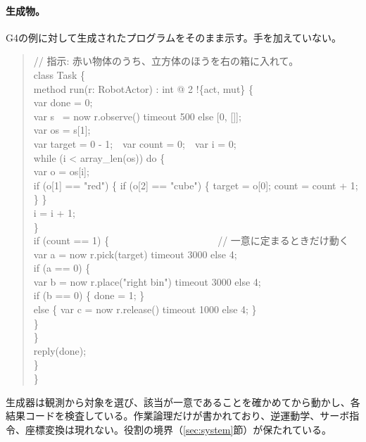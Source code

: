 \documentclass[10pt,letterpaper]{article}
\begin{document}
\paragraph{生成物。}G4の例に対して生成されたプログラムをそのまま示す。手を加えていない。
\begin{quote}\codefont\footnotesize
// 指示: 赤い物体のうち、立方体のほうを右の箱に入れて。\\
class Task \{\\
\hspace*{1em}method run(r: RobotActor) : int @ 2 !\{act, mut\} \{\\
\hspace*{2em}var done = 0;\\
\hspace*{2em}var s~ = now r.observe() timeout 500 else [0, []];\\
\hspace*{2em}var os = s[1];\\
\hspace*{2em}var target = 0 - 1;~~var count = 0;~~var i = 0;\\
\hspace*{2em}while (i < array\_len(os)) do \{\\
\hspace*{3em}var o = os[i];\\
\hspace*{3em}if (o[1] == "red") \{ if (o[2] == "cube") \{ target = o[0]; count = count + 1; \} \}\\
\hspace*{3em}i = i + 1;\\
\hspace*{2em}\}\\
\hspace*{2em}if (count == 1) \{~~~~~~~~~~~~~~~~~~~~~~// 一意に定まるときだけ動く\\
\hspace*{3em}var a = now r.pick(target) timeout 3000 else 4;\\
\hspace*{3em}if (a == 0) \{\\
\hspace*{4em}var b = now r.place("right bin") timeout 3000 else 4;\\
\hspace*{4em}if (b == 0) \{ done = 1; \}\\
\hspace*{4em}else \{ var c = now r.release() timeout 1000 else 4; \}\\
\hspace*{3em}\}\\
\hspace*{2em}\}\\
\hspace*{2em}reply(done);\\
\hspace*{1em}\}\\
\}
\end{quote}
生成器は観測から対象を選び、該当が一意であることを確かめてから動かし、各結果コードを検査している。作業論理だけが書かれており、逆運動学、サーボ指令、座標変換は現れない。役割の境界（\ref{sec:system}節）が保たれている。
\end{document}
